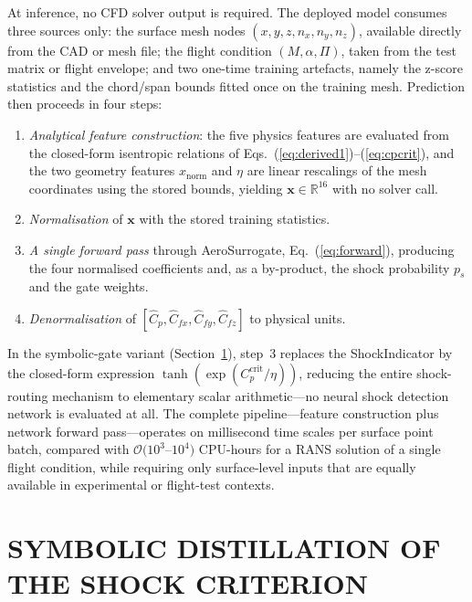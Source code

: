 \documentclass{WCCM-ECCOMAS_2026_Full_Paper}
\begin{document}
At inference, no CFD solver output is required.  The deployed model
consumes three sources only: the surface mesh nodes
$(x,y,z,n_x,n_y,n_z)$, available directly from the CAD or mesh file;
the flight condition $(M,\alpha,\Pi)$, taken from the test matrix or
flight envelope; and two one-time training artefacts, namely the
z-score statistics and the chord/span bounds fitted once on the
training mesh.  Prediction then proceeds in four steps:
\begin{enumerate}
  \item \emph{Analytical feature construction}: the five physics
        features are evaluated from the closed-form isentropic
        relations of Eqs.~(\ref{eq:derived1})--(\ref{eq:cpcrit}), and
        the two geometry features $x_{\mathrm{norm}}$ and $\eta$ are
        linear rescalings of the mesh coordinates using the stored
        bounds, yielding $\mathbf{x}\in\mathbb{R}^{16}$ with no solver
        call.
  \item \emph{Normalisation} of $\mathbf{x}$ with the stored training
        statistics.
  \item \emph{A single forward pass} through AeroSurrogate,
        Eq.~(\ref{eq:forward}), producing the four normalised
        coefficients and, as a by-product, the shock probability
        $p_s$ and the gate weights.
  \item \emph{Denormalisation} of
        $[\hat{C}_p,\hat{C}_{fx},\hat{C}_{fy},\hat{C}_{fz}]$ to
        physical units.
\end{enumerate}
In the symbolic-gate variant (Section~\ref{sec:sr}), step~3 replaces
the ShockIndicator by the closed-form expression
$\tanh(\exp(C_p^{\mathrm{crit}}/\eta))$, reducing the entire
shock-routing mechanism to elementary scalar arithmetic---no neural
shock detection network is evaluated at all.  The complete
pipeline---feature construction plus network forward pass---operates
on millisecond time scales per surface point batch, compared with
$\mathcal{O}(10^{3}$--$10^{4})$ CPU-hours for a RANS solution of a
single flight condition, while requiring only surface-level inputs
that are equally available in experimental or flight-test contexts.

\section{SYMBOLIC DISTILLATION OF THE SHOCK CRITERION}
\label{sec:sr}
\end{document}
